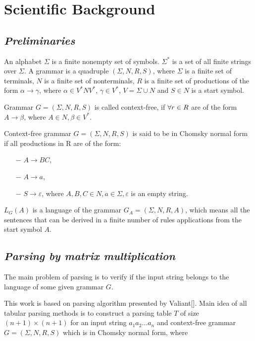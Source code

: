 \section{\bf Scientific Background}

\subsection{\bf \it Preliminaries}

An alphabet $\Sigma$ is a finite nonempty set of symbols. $\Sigma^{*}$ is a set of all finite strings over $\Sigma$.
A grammar is a quadruple $(\Sigma, N, R, S)$, where $\Sigma$ is a finite set of terminals, $N$ is a finite set of nonterminals, $R$ is a finite set of productions of the form $\alpha \rightarrow \gamma$, where $\alpha \in V^{*}NV^{*}$, $\gamma \in V^{*}$, $V = \Sigma \cup N$ and $S \in N$ is a start symbol.

Grammar $G = (\Sigma, N, R, S)$ is called context-free, if $\space\forall r \in R$ are of the form $A \rightarrow \beta$, where $A \in N, \beta \in V^{*}$.

Context-free grammar $G = (\Sigma, N, R, S)$ is said to be in Chomsky normal form if all productions in R are of the form:
\begin{itemize}[noitemsep, nolistsep]
    \item[$-$] $A \rightarrow BC$,
    \item[$-$] $A \rightarrow a$,
    \item[$-$] $S \rightarrow \varepsilon$, where $A, B, C \in N, a \in \Sigma, \varepsilon$ is an empty string.
\end{itemize}

$L_{G}(A)$ is a language of the grammar $G_{A} = (\Sigma, N, R, A)$, which means all the sentences that can be derived in a finite number of rules applications from the start symbol $A$.

\subsection{\bf \it Parsing by matrix multiplication}

The main problem of parsing is to verify if the input string belongs to the language of some given grammar $G$.

This work is based on parsing algorithm presented by Valiant[].
Main idea of all tabular parsing methods is to construct a parsing table $T$ of size $(n + 1) \times (n + 1)$ for an input string $a_{1}a_{2} \dots a_{n}$ and context-free grammar $G = (\Sigma, N, R, S)$ which is in Chomsky normal form, where

